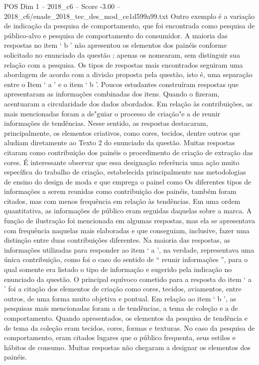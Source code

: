 \begin{textsample}{POS Dim 1 – 2018\_c6 – Score -3.00 – 2018\_c6/enade\_2018\_tec\_des\_mod\_ce1d599a99.txt}
Outro exemplo é a variação de indicação da pesquisa de comportamento, que foi encontrada como pesquisa de público-alvo e pesquisa de comportamento do consumidor.
A maioria das respostas no item ‘ b ’ não apresentou os elementos dos painéis conforme solicitado no enunciado da questão ; apenas os nomearam, sem distinguir sua relação com a pesquisa.
Os tipos de respostas mais encontrados seguiram uma abordagem de acordo com a divisão proposta pela questão, isto é, uma separação entre o Item ‘ a ’ e o item ‘ b ’.
Poucos estudantes construíram respostas que apresentaram as informações combinadas dos itens.
Quando o fizeram, acentuaram a circularidade dos dados abordados.
Em relação às contribuições, as mais mencionadas foram a de"guiar o processo de criação"e a de reunir informações de tendências.
Nesse sentido, as respostas destacaram, principalmente, os elementos criativos, como cores, tecidos, dentre outros que aludiam diretamente ao Texto 2 do enunciado da questão.
Muitas respostas citaram como contribuição dos painéis o procedimento de criação de extração das cores.
É interessante observar que essa designação referência uma ação muito específica do trabalho de criação, estabelecida principalmente nas metodologias de ensino do design de moda e que emprega o painel como Os diferentes tipos de informações a serem reunidas como contribuição dos painéis, também foram citados, mas com menos frequência em relação às tendências.
Em uma ordem quantitativa, as informações de público eram seguidas daquelas sobre a marca.
A função de ilustração foi mencionada em algumas respostas, mas ela se apresentava com frequência naquelas mais elaboradas e que conseguiam, inclusive, fazer uma distinção entre duas contribuições diferentes.
Na maioria das respostas, as informações utilizadas para responder ao item ‘ a ’, na verdade, representava uma única contribuição, como foi o caso do sentido de “ reunir informações ”, para o qual somente era listado o tipo de informação e sugerido pela indicação no enunciado da questão.
O principal equívoco cometido para a resposta do item ‘ a ’ foi a citação dos elementos de criação como cores, tecidos, aviamentos, entre outros, de uma forma muito objetiva e pontual.
Em relação ao item ‘ b ’, as pesquisas mais mencionadas foram a de tendências, a tema de coleção e a de comportamento.
Quando apresentados, os elementos da pesquisa de tendência e de tema da coleção eram tecidos, cores, formas e texturas.
No caso da pesquisa de comportamento, eram citados lugares que o público frequenta, seus estilos e hábitos de consumo.
Muitas respostas não chegaram a designar os elementos dos painéis.

\end{textsample}
